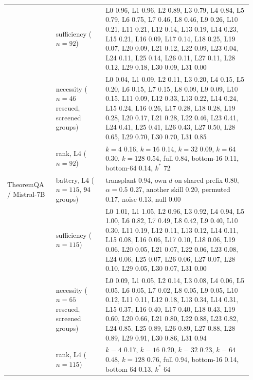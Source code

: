 \begin{tabular}{@{}p{}p{}p{}@{}}
 & sufficiency ($n=92$) & L0 0.96, L1 0.96, L2 0.89, L3 0.79, L4 0.84, L5 0.79, L6 0.75, L7 0.46, L8 0.46, L9 0.26, L10 0.21, L11 0.21, L12 0.14, L13 0.19, L14 0.23, L15 0.21, L16 0.09, L17 0.14, L18 0.25, L19 0.07, L20 0.09, L21 0.12, L22 0.09, L23 0.04, L24 0.11, L25 0.14, L26 0.11, L27 0.11, L28 0.12, L29 0.18, L30 0.09, L31 0.00 \\
 & necessity ($n=46$ rescued, screened groups) & L0 0.04, L1 0.09, L2 0.11, L3 0.20, L4 0.15, L5 0.20, L6 0.15, L7 0.15, L8 0.09, L9 0.09, L10 0.15, L11 0.09, L12 0.33, L13 0.22, L14 0.24, L15 0.24, L16 0.26, L17 0.28, L18 0.28, L19 0.28, L20 0.17, L21 0.28, L22 0.46, L23 0.41, L24 0.41, L25 0.41, L26 0.43, L27 0.50, L28 0.65, L29 0.70, L30 0.70, L31 0.85 \\
 & rank, L4 ($n=92$) & $k{=}4$ 0.16, $k{=}16$ 0.14, $k{=}32$ 0.09, $k{=}64$ 0.30, $k{=}128$ 0.54, full 0.84, bottom-16 0.11, bottom-64 0.14, $k^{*}$ 72 \\
\midrule
TheoremQA / Mistral-7B & battery, L4 ($n=115$, 94 groups) & transplant 0.94, own $d$ on shared prefix 0.80, $\alpha{=}0.5$ 0.27, another skill 0.20, permuted 0.17, noise 0.13, null 0.00 \\
 & sufficiency ($n=115$) & L0 1.01, L1 1.05, L2 0.96, L3 0.92, L4 0.94, L5 1.00, L6 0.82, L7 0.49, L8 0.42, L9 0.40, L10 0.30, L11 0.19, L12 0.11, L13 0.12, L14 0.11, L15 0.08, L16 0.06, L17 0.10, L18 0.06, L19 0.06, L20 0.05, L21 0.07, L22 0.06, L23 0.08, L24 0.06, L25 0.07, L26 0.06, L27 0.07, L28 0.10, L29 0.05, L30 0.07, L31 0.00 \\
 & necessity ($n=65$ rescued, screened groups) & L0 0.09, L1 0.05, L2 0.14, L3 0.08, L4 0.06, L5 0.05, L6 0.05, L7 0.02, L8 0.05, L9 0.05, L10 0.12, L11 0.11, L12 0.18, L13 0.34, L14 0.31, L15 0.37, L16 0.40, L17 0.40, L18 0.43, L19 0.60, L20 0.66, L21 0.80, L22 0.88, L23 0.82, L24 0.85, L25 0.89, L26 0.89, L27 0.88, L28 0.89, L29 0.91, L30 0.86, L31 0.94 \\
 & rank, L4 ($n=115$) & $k{=}4$ 0.17, $k{=}16$ 0.20, $k{=}32$ 0.23, $k{=}64$ 0.48, $k{=}128$ 0.76, full 0.94, bottom-16 0.14, bottom-64 0.13, $k^{*}$ 64 \\
\bottomrule
\end{tabular}
